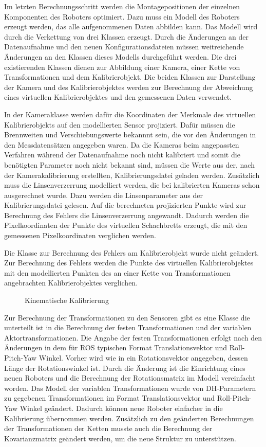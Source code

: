 Im letzten Berechnungsschritt werden die Montagepositionen der einzelnen Komponenten des 
Roboters optimiert. Dazu muss ein Modell des Roboters erzeugt werden, das 
alle aufgenommenen Daten abbilden kann. Das Modell wird durch die Verkettung
von drei Klassen erzeugt. Durch die Änderungen an der Datenaufnahme
und den neuen Konfigurationsdateien müssen weitreichende Änderungen an den 
Klassen dieses Modells durchgeführt werden. Die drei existierenden Klassen 
dienen zur Abbildung einer Kamera, einer Kette von Transformationen und
dem Kalibrierobjekt. Die beiden Klassen zur Darstellung der Kamera und des 
Kalibrierobjektes werden zur Berechnung der Abweichung eines virtuellen
Kalibrierobjektes und den gemessenen Daten verwendet.

In der Kameraklasse werden dafür die Koordinaten der Merkmale des virtuellen 
Kalibrierobjekts auf den modellierten Sensor projiziert. Dafür müssen die
Brennweiten und Verschiebungswerte bekannnt sein, die vor den Änderungen in den
Messdatensätzen angegeben waren. Da die Kameras beim angepassten Verfahren 
während der Datenaufnahme noch nicht kalibriert und somit die benötigten 
Parameter noch nicht bekannt sind, müssen die Werte aus der, nach der
Kamerakalibrierung erstellten, Kalibrierungsdatei geladen werden. 
Zusätzlich muss die Linsenverzerrung modelliert werden, die bei kalibrierten 
Kameras schon ausgerechnet wurde. Dazu werden die Linsenparameter aus der 
Kalibrierungsdatei gelesen. Auf die berechneten projizierten Punkte wird zur 
Berechnung des Fehlers die Linsenverzerrung angewandt. Dadurch werden
die Pixelkoordinaten der Punkte des virtuellen Schachbretts erzeugt, die mit 
den gemessenen Pixelkoordinaten verglichen werden.

Die Klasse zur Berechnung des Fehlers am Kalibrierobjekt wurde nicht geändert.
Zur Berechnung des Fehlers werden die Punkte des virtuellen Kalibrierobjektes
mit den modellierten Punkten des an einer Kette von Transformationen angebrachten
Kalibrierobjektes verglichen.

\begin{figure}[htpb]
  \centering

    \label{fig:run_calibration}
    \caption{Kinematische Kalibrierung}
\end{figure}

Zur Berechnung der Transformationen zu den Sensoren gibt es eine Klasse die 
unterteilt ist in die Berechnung der festen Transformationen und der variablen
Aktortransformationen. Die Angabe der festen Transformationen erfolgt nach den
Änderungen in dem für \ac{ROS} typischen Format Translationsvektor und
Roll-Pitch-Yaw Winkel. Vorher wird wie in \cite[Abschnitt 3.3.2]{pr2_estimation}
ein Rotationsvektor angegeben, dessen Länge der Rotationswinkel ist. 
Durch die Änderung ist die Einrichtung eines neuen Roboters und die Berechnung
der Rotationsmatrix im Modell vereinfacht worden. 
Das Modell der variablen Transformationen wurde von \ac{DH-Parameter}n zu
gegebenen Transformationen im Format Translationsvektor und 
Roll-Pitch-Yaw Winkel geändert. Dadurch können neue Roboter einfacher in die 
Kalibrierung übernommen werden. 
Zusätzlich zu den geänderten Berechnungen der Transformationen der Ketten musste
auch die Berechnung der Kovarianzmatrix geändert werden, um die neue Struktur zu 
unterstützen. 

